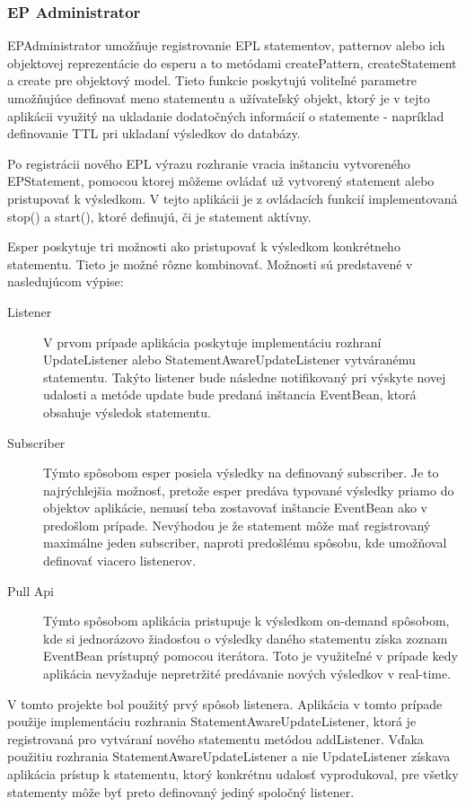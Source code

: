 		\subsubsection{EP Administrator}
		EPAdministrator umožňuje registrovanie EPL statementov, patternov alebo ich objektovej reprezentácie do esperu a to metódami createPattern, createStatement a create pre objektový model. Tieto funkcie poskytujú voliteľné parametre umožňujúce definovať meno statementu a užívateľský objekt, ktorý je v tejto aplikácii využitý na ukladanie dodatočných informácií o statemente - napríklad definovanie TTL pri ukladaní výsledkov do databázy.
		
		Po registrácii nového EPL výrazu rozhranie vracia inštanciu vytvoreného EPStatement, pomocou ktorej môžeme ovládať už vytvorený statement alebo pristupovať k výsledkom. V tejto aplikácii je z ovládacích funkcií implementovaná stop() a start(), ktoré definujú, či je statement aktívny.
		
		Esper poskytuje tri možnosti ako pristupovať k výsledkom konkrétneho statementu. Tieto je možné rôzne kombinovať. Možnosti sú predstavené v nasledujúcom výpise:
		\begin{description}
			\item[Listener] V prvom prípade aplikácia poskytuje implementáciu rozhraní UpdateListener alebo StatementAwareUpdateListener vytváranému statementu. Takýto listener bude následne notifikovaný pri výskyte novej udalosti a metóde update bude predaná inštancia EventBean, ktorá obsahuje výsledok statementu.
			\item[Subscriber] Týmto spôsobom esper posiela výsledky na definovaný subscriber. Je to najrýchlejšia možnosť, pretože esper predáva typované výsledky priamo do objektov aplikácie, nemusí teba zostavovať inštancie EventBean ako v predošlom prípade. Nevýhodou je že statement môže mať registrovaný maximálne jeden subscriber, naproti predošlému spôsobu, kde umožňoval definovať viacero listenerov.
			\item[Pull Api] Týmto spôsobom aplikácia pristupuje k výsledkom on-demand spôsobom, kde si jednorázovo žiadosťou o výsledky daného statementu získa zoznam EventBean prístupný pomocou iterátora. Toto je využiteľné v prípade kedy aplikácia nevyžaduje nepretržité predávanie nových výsledkov v real-time.
		\end{description}
		V tomto projekte bol použitý prvý spôsob listenera. Aplikácia v tomto prípade použije implementáciu rozhrania StatementAwareUpdateListener, ktorá je registrovaná pro vytváraní nového statementu metódou addListener. Vďaka použitiu rozhrania StatementAwareUpdateListener a nie UpdateListener získava aplikácia prístup k statementu, ktorý konkrétnu udalosť vyprodukoval, pre všetky statementy môže byť preto definovaný jediný spoločný listener.
		
